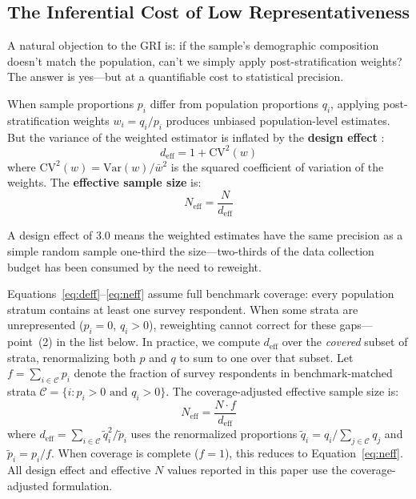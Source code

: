 \documentclass[11pt,a4paper]{article}
\begin{document}
\subsection{The Inferential Cost of Low Representativeness}

A natural objection to the GRI is: if the sample's demographic composition doesn't match the population, can't we simply apply post-stratification weights? The answer is yes---but at a quantifiable cost to statistical precision.

When sample proportions $p_i$ differ from population proportions $q_i$, applying post-stratification weights $w_i = q_i / p_i$ produces unbiased population-level estimates. But the variance of the weighted estimator is inflated by the \textbf{design effect} \citep{kish1965survey}:
\begin{equation}\label{eq:deff}
    d_{\text{eff}} = 1 + \text{CV}^2(w)
\end{equation}
where $\text{CV}^2(w) = \text{Var}(w) / \bar{w}^2$ is the squared coefficient of variation of the weights. The \textbf{effective sample size} is:
\begin{equation}\label{eq:neff}
    N_{\text{eff}} = \frac{N}{d_{\text{eff}}}
\end{equation}

A design effect of 3.0 means the weighted estimates have the same precision as a simple random sample one-third the size---two-thirds of the data collection budget has been consumed by the need to reweight.

Equations~\eqref{eq:deff}--\eqref{eq:neff} assume full benchmark coverage: every population stratum contains at least one survey respondent. When some strata are unrepresented ($p_i = 0$, $q_i > 0$), reweighting cannot correct for these gaps---point~(2) in the list below. In practice, we compute $d_{\text{eff}}$ over the \emph{covered} subset of strata, renormalizing both $p$ and $q$ to sum to one over that subset. Let $f = \sum_{i \in \mathcal{C}} p_i$ denote the fraction of survey respondents in benchmark-matched strata $\mathcal{C} = \{i : p_i > 0 \text{ and } q_i > 0\}$. The coverage-adjusted effective sample size is:
\begin{equation}\label{eq:neff_adj}
    N_{\text{eff}} = \frac{N \cdot f}{d_{\text{eff}}}
\end{equation}
where $d_{\text{eff}} = \sum_{i \in \mathcal{C}} \tilde{q}_i^2 / \tilde{p}_i$ uses the renormalized proportions $\tilde{q}_i = q_i / \sum_{j \in \mathcal{C}} q_j$ and $\tilde{p}_i = p_i / f$. When coverage is complete ($f = 1$), this reduces to Equation~\eqref{eq:neff}. All design effect and effective $N$ values reported in this paper use the coverage-adjusted formulation.
\end{document}
